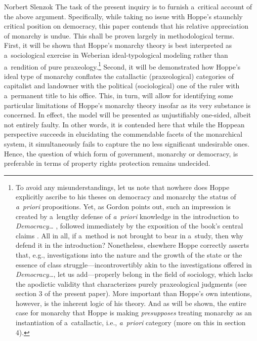\begin{artengenv}{Norbert Slenzok}
The task of the present inquiry is to furnish a~critical account of the above argument. Specifically, while taking no issue with Hoppe's staunchly critical position on democracy, this paper contends that his relative appreciation of monarchy is undue. This shall be proven largely in methodological terms. First, it will be shown that Hoppe's monarchy theory is best interpreted as a~sociological exercise in Weberian ideal-typological modeling rather than a~rendition of pure praxeology.\footnote{To avoid any misunderstandings, let us note that nowhere does Hoppe explicitly ascribe to his theses on democracy and monarchy the status of \textit{a~priori} propositions. Yet, as Gordon 
\parencite*[][pp.98–99]{gordon_austro-libertarian_2017} %
 points out, such an impression is created by a~lengthy defense of \textit{a~priori} knowledge in the introduction to \textit{Democracy…} 
\parencite[][pp.xv–xix]{hoppe_democracy_2007}, %
 followed immediately by the exposition of the book's central claims 
\parencite[][pp.xix–xxi]{hoppe_democracy_2007}. %
 All in all, if a~method is not brought to bear in a~study, then why defend it in the introduction? Nonetheless, elsewhere Hoppe 
\parencites*[][p.33]{hoppe_economics_2006}[][p.16]{hoppe_short_2015} %
 correctly asserts that, e.g., investigations into the nature and the growth of the state or the essence of class struggle---incontrovertibly akin to the investigations offered in \textit{Democracy…}, let us add---properly belong in the field of sociology, which lacks the apodictic validity that characterizes purely praxeological judgments (see section 3 of the present paper). More important than Hoppe's own intentions, however, is the inherent logic of his theory. And as will be shown, the entire case for monarchy that Hoppe is making \textit{presupposes} treating monarchy as an instantiation of a~catallactic, i.e., \textit{a~priori} category (more on this in section 4). } Second, it will be demonstrated how Hoppe's ideal type of monarchy conflates the catallactic (praxeological) categories of capitalist and landowner with the political (sociological) one of the ruler with a~permanent title to his office. This, in turn, will allow for identifying some particular limitations of Hoppe's monarchy theory insofar as its very substance is concerned. In effect, the model will be presented as unjustifiably one-sided, albeit not entirely faulty. In other words, it is contended here that while the Hoppean perspective succeeds in elucidating the commendable facets of the monarchical system, it simultaneously fails to capture the no less significant undesirable ones. Hence, the question of which form of government, monarchy or democracy, is preferable in terms of property rights protection remains undecided.




\end{artengenv}
